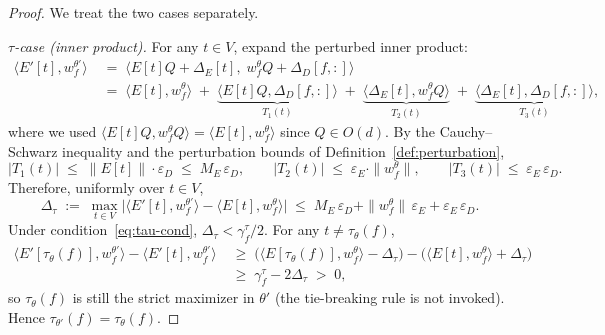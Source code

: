 \documentclass[11pt,letterpaper]{article}
\theoremstyle{definition}
\begin{document}
\begin{proof}
We treat the two cases separately.

\emph{$\tau$-case (inner product).} For any $t \in V$, expand the perturbed inner product:
\begin{align*}
\big\langle E'[t], w_f^{\theta'} \big\rangle
&\;=\; \big\langle E[t] Q + \Delta_E[t], \; w_f^\theta Q + \Delta_D[f, :] \big\rangle \\
&\;=\; \big\langle E[t], w_f^\theta \big\rangle \;+\; \underbrace{\big\langle E[t] Q, \Delta_D[f, :] \big\rangle}_{T_1(t)} \;+\; \underbrace{\big\langle \Delta_E[t], w_f^\theta Q \big\rangle}_{T_2(t)} \;+\; \underbrace{\big\langle \Delta_E[t], \Delta_D[f, :] \big\rangle}_{T_3(t)},
\end{align*}
where we used $\langle E[t]Q, w_f^\theta Q \rangle = \langle E[t], w_f^\theta \rangle$ since $Q \in O(d)$. By the Cauchy--Schwarz inequality and the perturbation bounds of Definition~\ref{def:perturbation},
\[
|T_1(t)| \;\leq\; \|E[t]\| \cdot \varepsilon_D \;\leq\; M_E \, \varepsilon_D, \qquad
|T_2(t)| \;\leq\; \varepsilon_E \cdot \|w_f^\theta\|, \qquad
|T_3(t)| \;\leq\; \varepsilon_E \, \varepsilon_D.
\]
Therefore, uniformly over $t \in V$,
\[
\Delta_\tau \;:=\; \max_{t \in V} \big| \langle E'[t], w_f^{\theta'} \rangle - \langle E[t], w_f^\theta \rangle \big| \;\leq\; M_E \, \varepsilon_D + \|w_f^\theta\| \, \varepsilon_E + \varepsilon_E \, \varepsilon_D.
\]
Under condition~\eqref{eq:tau-cond}, $\Delta_\tau < \gamma_f^\tau / 2$. For any $t \neq \tau_\theta(f)$,
\begin{align*}
\big\langle E'[\tau_\theta(f)], w_f^{\theta'} \big\rangle - \big\langle E'[t], w_f^{\theta'} \big\rangle
&\;\geq\; \big( \langle E[\tau_\theta(f)], w_f^\theta \rangle - \Delta_\tau \big) - \big( \langle E[t], w_f^\theta \rangle + \Delta_\tau \big) \\
&\;\geq\; \gamma_f^\tau - 2 \Delta_\tau \;>\; 0,
\end{align*}
so $\tau_\theta(f)$ is still the strict maximizer in $\theta'$ (the tie-breaking rule is not invoked). Hence $\tau_{\theta'}(f) = \tau_\theta(f)$.


\end{proof}
\end{document}
